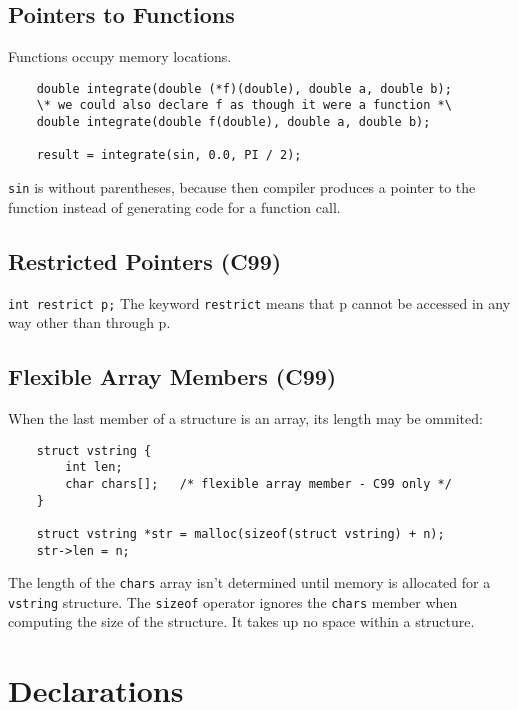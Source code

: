 \documentclass[openany]{book}
\begin{document}
    \newpage

    \section{Pointers to Functions}
    Functions occupy memory locations.

    \begin{lstlisting}
    double integrate(double (*f)(double), double a, double b);
    \* we could also declare f as though it were a function *\
    double integrate(double f(double), double a, double b);

    result = integrate(sin, 0.0, PI / 2);
    \end{lstlisting}
    \texttt{sin} is without parentheses, because then compiler produces a pointer to the function instead of generating code for a function call.

    \section{Restricted Pointers (C99)}

    \texttt{int restrict p;}
    The keyword \texttt{restrict} means that p cannot be accessed in any way other than through p.

    \section{Flexible Array Members (C99)}

    When the last member of a structure is an array, its length may be ommited:

    \begin{lstlisting}
    struct vstring {
        int len;
        char chars[];   /* flexible array member - C99 only */
    }

    struct vstring *str = malloc(sizeof(struct vstring) + n);
    str->len = n;
    \end{lstlisting}

    The length of the \texttt{chars} array isn't determined until memory is allocated for a \texttt{vstring} structure. The \texttt{sizeof} operator ignores the \texttt{chars} member when computing the size of the structure. It takes up no space within a structure.



    \chapter{Declarations}
\end{document}
